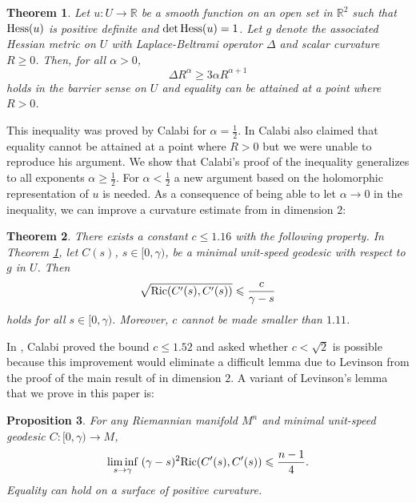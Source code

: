\documentclass[11pt,reqno]{amsart}
\renewcommand{\leq}{\leqslant}
\renewcommand{\geq}{\geqslant}
\theoremstyle{plain}
\newtheorem{theorem}{Theorem}[section]
\newtheorem{proposition}[theorem]{Proposition}
\theoremstyle{definition}
\numberwithin{equation}{section}
\begin{document}
\begin{theorem}\label{main:curv_diffeq}
Let $u: U \to \mathbb{R}$ be a smooth function on an open set in $\mathbb{R}^{2}$ such that ${\rm Hess}(u)$ is positive definite and ${\rm det}\,{\rm Hess}(u) = 1$. Let $g$ denote the associated Hessian metric on $U$ with Laplace-Beltrami operator $\Delta$ and scalar curvature $R \geq 0$.   Then, for all $\alpha >0$,
$$\Delta R^{\alpha}\geq 3\alpha R^{\alpha+1}$$
holds in the barrier sense on $U$ and equality can be attained at a point where $R > 0$.
\end{theorem}

This inequality was proved by Calabi \cite{EC} for $\alpha = \frac{1}{2}$. In \cite[p. 114]{EC} Calabi also claimed that equality cannot be attained at a point where $R > 0$ but we were unable to reproduce his argument. We show that Calabi's proof of the inequality generalizes to all exponents $\alpha \geq \frac{1}{2}$. For $\alpha < \frac{1}{2}$ a new argument based on the holomorphic representation of $u$ is needed. As a consequence of being able to let $\alpha \to 0$ in the inequality, we can improve a curvature estimate from \cite{EC} in dimension $2$:

\begin{theorem}\label{thm:improved:calabi}
There exists a constant $c \leq 1.16$ with the following property. In Theorem \ref{main:curv_diffeq}, let $C(s)$, $s \in [0,\gamma)$, be a minimal unit-speed geodesic with respect to $g$ in $U$. Then
\begin{equation}\label{eq:glob:curv:geo}\sqrt{{\rm Ric}(C'(s),C'(s))} \leq \frac{c}{\gamma-s}\end{equation}
holds for all $s \in [0,\gamma)$. Moreover, $c$ cannot be made smaller than $1.11$.
\end{theorem}

In \cite{EC}, Calabi proved the bound $c \leq 1.52$ and asked \cite[p. 122]{EC} whether $c < \sqrt{2}$ is possible because this improvement would eliminate a difficult lemma due to Levinson \cite[p. 123]{EC} from the proof of the main result of \cite{EC} in dimension $2$. A variant of Levinson's lemma that we prove in this paper is:

\begin{proposition}\label{prop:levin:mod}
For any Riemannian manifold $M^n$ and minimal unit-speed geodesic $C: [0,\gamma) \to M$,
\begin{equation}\label{eq:levin}\liminf_{s \to \gamma} \;(\gamma-s)^2{\rm Ric}(C'(s),C'(s)) \leq \frac{n-1}{4}.\end{equation}
Equality can hold on a surface of positive curvature.
\end{proposition}
\end{document}
